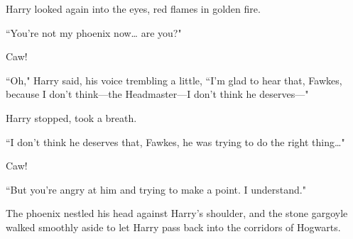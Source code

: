 Harry looked again into the eyes, red flames in golden fire.

``You're not my phoenix now{\ldots} are you?"

Caw!

``Oh," Harry said, his voice trembling a little, ``I'm glad to hear that, Fawkes, because I don't think---the Headmaster---I don't think he deserves---"

Harry stopped, took a breath.

``I don't think he deserves that, Fawkes, he was trying to do the right thing{\ldots}"

Caw!

``But you're angry at him and trying to make a point. I understand."

The phoenix nestled his head against Harry's shoulder, and the stone gargoyle walked smoothly aside to let Harry pass back into the corridors of Hogwarts.

